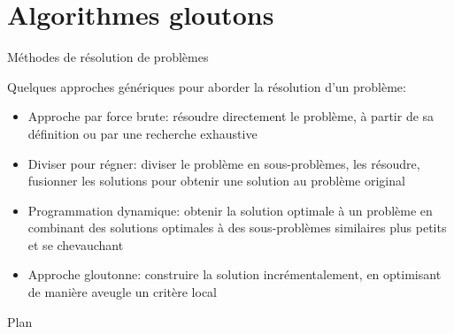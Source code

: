 \section{Algorithmes gloutons}

\begin{frame}{Méthodes de résolution de problèmes}

Quelques approches génériques pour aborder la résolution d'un problème:
\begin{itemize}
\item \alert{Approche par force brute:} résoudre directement le problème, à partir de sa définition ou par une recherche exhaustive
\item \alert{Diviser pour régner:} diviser le problème en sous-problèmes, les résoudre, fusionner les solutions pour obtenir une solution au problème original
\item \alert{Programmation dynamique:} obtenir la solution optimale à un problème en combinant des solutions optimales à des sous-problèmes similaires plus petits et se chevauchant
\item \alert{Approche gloutonne:} construire la solution incrémentalement, en optimisant de manière aveugle un critère local
\end{itemize}

\end{frame}

\begin{frame}{Plan}


\end{frame}


